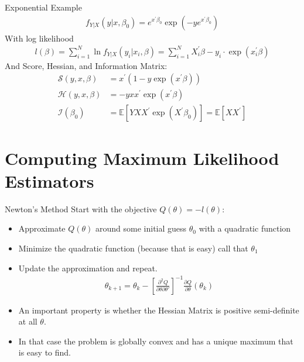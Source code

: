 \documentclass[aspectratio=169]{beamer}
\begin{document}
\begin{frame}{Exponential Example}
\begin{align*}
f _ { Y | X } ( y | x , \beta _ { 0 } ) =  { e } ^ { x ^ { \prime } \beta _ { 0 } } \exp \left( - y  { e } ^ { x ^ { \prime } \beta _ { 0 } } \right)
\end{align*}
With log likelihood
\begin{align*}
l( \beta ) = \sum _ { i = 1 } ^ { N } \ln f _ { Y | X } \left( y _ { i } | x _ { i } , \beta \right) = \sum _ { i = 1 } ^ { N } X _ { i } ^ { \prime } \beta - y _ { i } \cdot \exp \left( x _ { i } ^ { \prime } \beta \right)
\end{align*}
And Score, Hessian, and Information Matrix:
\begin{align*}
\mathcal { S } ( y , x , \beta ) &= x ^ { \prime } \left( 1 - y \exp \left( x ^ { \prime } \beta \right) \right)\\
\mathcal { H } ( y , x , \beta ) &= - y x x ^ { \prime } \exp \left( x ^ { \prime } \beta \right)\\
\mathcal { I } \left( \beta _ { 0 } \right) &= \mathbb { E } \left[ Y X X ^ { \prime } \exp \left( X ^ { \prime } \beta _ { 0 } \right) \right] = \mathbb { E } \left[ X X ^ { \prime } \right]
\end{align*}
\end{frame}


\section*{Computing Maximum Likelihood Estimators}

\begin{frame}{Newton's Method}
Start with the objective $Q(\theta) = - l(\theta)$:
\begin{itemize}
\item Approximate $Q(\theta)$ around some initial guess $\theta_0$ with a quadratic function
\item Minimize the quadratic function (because that is easy) call that $\theta_1$
\item Update the approximation and repeat.
\begin{align*}
\theta_{k+1} = \theta_k - \left[ \frac{\partial^2 Q}{\partial \theta \partial \theta'} \right]^{-1}\frac{\partial Q}{\partial \theta}(\theta_k)
\end{align*}
\item An important property is whether the \alert{Hessian Matrix} is positive semi-definite at all $\theta$.
\item In that case the problem is \alert{globally convex} and has a \alert{unique maximum} that is easy to find.
\end{itemize}
\end{frame}
\end{document}
